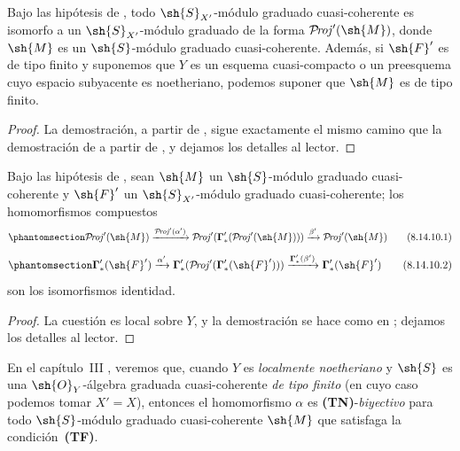 \documentclass[oneside,10pt]{amsart}
\def\shProj{\mathcal{P}\!\mathit{roj}}
\newcommand{\oldpage}[2][]{\marginnote{\normalfont\footnotesize\textbf{#1}~|~#2}\ignorespaces}
\let\EGAOriginalLabel\label
\renewcommand{\label}[1]{\phantomsection\EGAOriginalLabel{#1}}
\begin{document}
\begin{corollary}[8.14.9]
\label{II.8.14.9}
Bajo las hipótesis de , todo $\sh{S}_{X'}$-módulo graduado cuasi-coherente es isomorfo a un $\sh{S}_{X'}$-módulo graduado de la forma $\shProj'(\sh{M})$, donde $\sh{M}$ es un $\sh{S}$-módulo graduado cuasi-coherente.
Además, si $\sh{F}'$ es de tipo finito y suponemos que $Y$ es un esquema cuasi-compacto o un preesquema cuyo espacio subyacente es noetheriano, podemos suponer que $\sh{M}$ es de tipo finito.
\end{corollary}

\begin{proof}
La demostración, a partir de , sigue exactamente el mismo camino que la demostración de  a partir de , y dejamos los detalles al lector.
\end{proof}

\begin{proposition}[8.14.10]
\label{II.8.14.10}
Bajo las hipótesis de , sean $\sh{M}$ un $\sh{S}$-módulo graduado cuasi-coherente y $\sh{F}'$ un $\sh{S}_{X'}$-módulo graduado cuasi-coherente;
los homomorfismos compuestos
\[
\label{II.8.14.10.1}
    \shProj'(\sh{M})
    \xrightarrow{\shProj'(\alpha')}
    \shProj'(\boldsymbol{\Gamma}'_*(\shProj'(\sh{M})))
    \xrightarrow{\beta'}
    \shProj'(\sh{M})
\tag{8.14.10.1}
\]
\[
\label{II.8.14.10.2}
    \boldsymbol{\Gamma}'_*(\sh{F}')
    \xrightarrow{\alpha'}
    \boldsymbol{\Gamma}'_*(\shProj'(\boldsymbol{\Gamma}'_*(\sh{F}')))
    \xrightarrow{\boldsymbol{\Gamma}'_*(\beta')}
    \boldsymbol{\Gamma}'_*(\sh{F}')
\tag{8.14.10.2}
\]
son los isomorfismos identidad.
\end{proposition}

\begin{proof}
La cuestión es local sobre $Y$, y la demostración se hace como en ;
dejamos los detalles al lector.
\end{proof}

\begin{remark}[8.14.11]
\label{II.8.14.11}
En el capítulo~III , veremos que, cuando $Y$ es \emph{localmente noetheriano} y $\sh{S}$ es una $\sh{O}_Y$-álgebra graduada cuasi-coherente \emph{de tipo finito} (en cuyo caso
\oldpage[II]{201}
podemos tomar $X'=X$), entonces el homomorfismo $\alpha$  es \textbf{(TN)}-\emph{biyectivo} para todo $\sh{S}$-módulo graduado cuasi-coherente $\sh{M}$ que satisfaga la condición~\textbf{(TF)}.
\end{remark}
\end{document}
